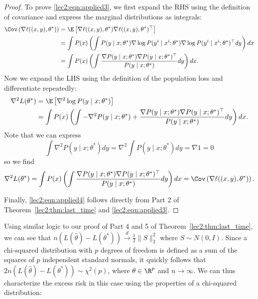 \begin{proof}
To prove \eqref{lec2:eqn:applied3}, we first expand the RHS using the definition of covariance and express the marginal distributions as integrals:
\begin{align}
    \Cov \left( \nabla \ell ((x, y), \theta^*) \right) &= \E \left[ \nabla \ell ((x, y), \theta^*) \nabla \ell ((x, y), \theta^*)^\top \right] \\
    &= \int P(x) \left( \int P(y \mid x; \theta^*) \nabla \log P( y\sp{i} \mid x\sp{i} ; \theta^*) \nabla \log P( y\sp{i} \mid x\sp{i} ; \theta^*)^\top dy \right) dx \\
    &= \int P(x) \left( \int \frac{\nabla P(y \mid x; \theta^*) \nabla P(y \mid x; \theta^*)^\top}{P(y \mid x; \theta^*)}dy \right) dx.
\end{align}
Now we expand the LHS using the definition of the population loss and differentiate repeatedly:
\begin{align}
    \nabla^2 L(\theta^*) &= \E \left[ \nabla^2 \log P(y \mid x; \theta^*) \right] \\
    &= \int P(x) \left( \int - \nabla^2 P(y \mid x; \theta^*) + \frac{\nabla P(y \mid x; \theta^*) \nabla P(y \mid x; \theta^*)^\top}{P(y \mid x; \theta^*)}dy  \right) dx.
\end{align}
Note that we can express 
\begin{equation} \int \nabla^2 P(y \mid x; \theta^*) dy = \nabla^2 \int P(y \mid x; \theta^*) dy = \nabla 1  = 0 \end{equation}
so we find
\begin{equation} \nabla^2 L(\theta^*) = \int P(x) \left( \int \frac{\nabla P(y \mid x; \theta^*) \nabla P(y \mid x; \theta^*)^\top}{P(y \mid x; \theta^*)}dy \right) dx = \Cov \left( \nabla \ell ((x, y), \theta^*) \right). \end{equation}

Finally, \eqref{lec2:eqn:applied4} follows directly from Part 2 of Theorem~\ref{lec2:thm:last_time} and \eqref{lec2:eqn:applied3}.
\end{proof}

Using similar logic to our proof of Part 4 and 5 of Theorem~\ref{lec2:thm:last_time}, we can see that $n (L(\hat \theta) - L(\theta^*)) \overset d \to \frac12 \|S\|_2^2$ where $S \sim N(0, I)$. Since a chi-squared distribution with $p$ degrees of freedom is defined as a sum of the squares of $p$ independent standard normals, it quickly follows that $2n (L(\hat \theta) - L(\theta^*)) \sim  \chi^2(p)$, where $\theta \in \R^p$ and $n \to \infty$. We can thus characterize the excess risk in this case using the properties of a chi-squared distribution:

